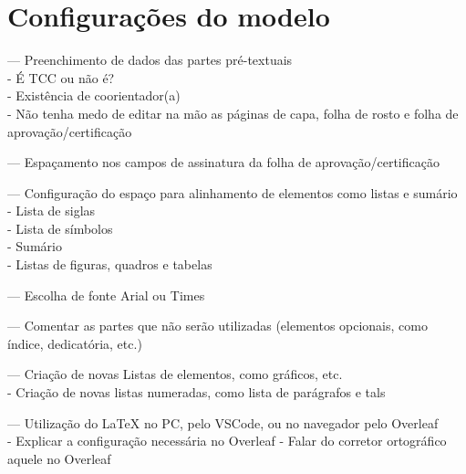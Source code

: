 \chapter{Configurações do modelo}\label{capitulo:configuracao}
--- Preenchimento de dados das partes pré-textuais\\
    - É TCC ou não é?\\
    - Existência de coorientador(a)\\
    - Não tenha medo de editar na mão as páginas de capa, folha de rosto e folha de aprovação/certificação

--- Espaçamento nos campos de assinatura da folha de aprovação/certificação

--- Configuração do espaço para alinhamento de elementos como listas e sumário\\
    - Lista de siglas\\
    - Lista de símbolos\\
    - Sumário\\
    - Listas de figuras, quadros e tabelas

--- Escolha de fonte Arial ou Times

--- Comentar as partes que não serão utilizadas (elementos opcionais, como índice, dedicatória, etc.)

--- Criação de novas Listas de elementos, como gráficos, etc.\\
    - Criação de novas listas numeradas, como lista de parágrafos e tals

--- Utilização do \LaTeX{} no PC, pelo VSCode, ou no navegador pelo Overleaf\\
    - Explicar a configuração necessária no Overleaf
    - Falar do corretor ortográfico aquele no Overleaf

